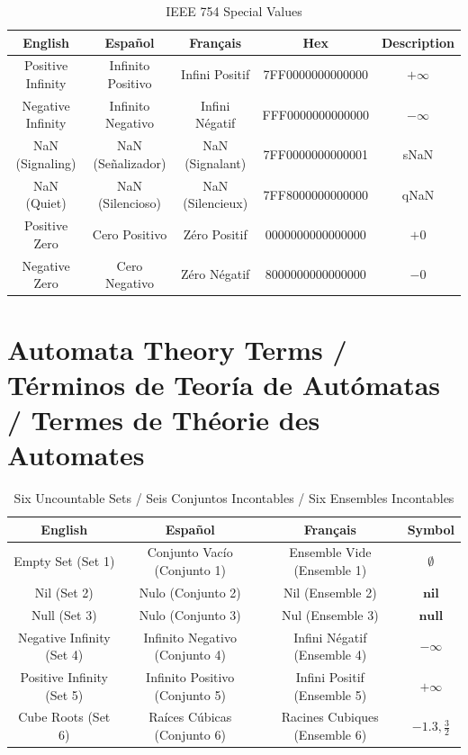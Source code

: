 \documentclass[12pt]{article}
\begin{document}
\begin{table}[h]
\centering
\begin{tabular}{|c|c|c|c|c|}
\hline
\textbf{English} & \textbf{Español} & \textbf{Français} & \textbf{Hex} & \textbf{Description} \\
\hline
Positive Infinity & Infinito Positivo & Infini Positif & 7FF0000000000000 & $+\infty$ \\
\hline
Negative Infinity & Infinito Negativo & Infini Négatif & FFF0000000000000 & $-\infty$ \\
\hline
NaN (Signaling) & NaN (Señalizador) & NaN (Signalant) & 7FF0000000000001 & sNaN \\
\hline
NaN (Quiet) & NaN (Silencioso) & NaN (Silencieux) & 7FF8000000000000 & qNaN \\
\hline
Positive Zero & Cero Positivo & Zéro Positif & 0000000000000000 & $+0$ \\
\hline
Negative Zero & Cero Negativo & Zéro Négatif & 8000000000000000 & $-0$ \\
\hline
\end{tabular}
\caption{IEEE 754 Special Values}
\end{table}

\section{Automata Theory Terms / Términos de Teoría de Autómatas / Termes de Théorie des Automates}

\begin{table}[h]
\centering
\begin{tabular}{|c|c|c|c|}
\hline
\textbf{English} & \textbf{Español} & \textbf{Français} & \textbf{Symbol} \\
\hline
Empty Set (Set 1) & Conjunto Vacío (Conjunto 1) & Ensemble Vide (Ensemble 1) & $\emptyset$ \\
\hline
Nil (Set 2) & Nulo (Conjunto 2) & Nil (Ensemble 2) & $\mathbf{nil}$ \\
\hline
Null (Set 3) & Nulo (Conjunto 3) & Nul (Ensemble 3) & $\mathbf{null}$ \\
\hline
Negative Infinity (Set 4) & Infinito Negativo (Conjunto 4) & Infini Négatif (Ensemble 4) & $-\infty$ \\
\hline
Positive Infinity (Set 5) & Infinito Positivo (Conjunto 5) & Infini Positif (Ensemble 5) & $+\infty$ \\
\hline
Cube Roots (Set 6) & Raíces Cúbicas (Conjunto 6) & Racines Cubiques (Ensemble 6) & $-1.3, \frac{3}{2}$ \\
\hline
\end{tabular}
\caption{Six Uncountable Sets / Seis Conjuntos Incontables / Six Ensembles Incontables}
\end{table}
\end{document}
